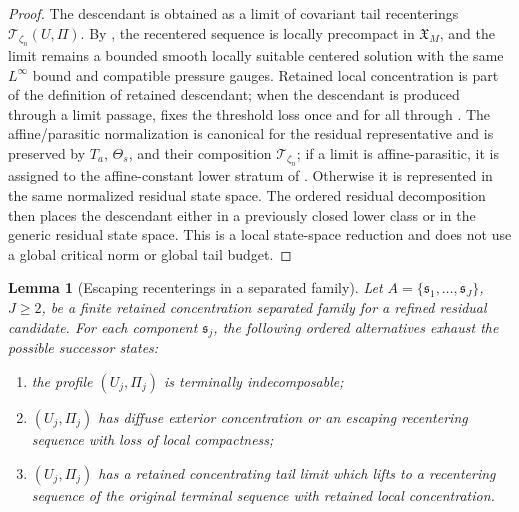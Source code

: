 \documentclass[11pt]{amsart}
\numberwithin{equation}{section}
\theoremstyle{plain}
\newtheorem{lemma}[theorem]{Lemma}
\theoremstyle{definition}
\theoremstyle{remark}
\begin{document}
\begin{proof}
The descendant is obtained as a limit of covariant tail recenterings
\(\mathscr T_{\zeta_n}(U,\Pi)\).  By
, the recentered sequence is locally
precompact in \(\mathfrak X_M\), and the limit remains a bounded smooth
locally suitable centered solution with the same \(L^\infty\) bound and
compatible pressure gauges.  Retained local concentration is part of the
definition of retained descendant; when the descendant is produced through a
limit passage,  fixes the threshold loss once and
for all through .  The affine/parasitic
normalization is canonical for the residual representative and is preserved by
\(T_a\), \(\Theta_s\), and their composition
\(\mathscr T_{\zeta_n}\); if a limit is affine-parasitic, it is assigned to the
affine-constant lower stratum of
.  Otherwise it is represented in the
same normalized residual state space.  The ordered residual decomposition then
places the descendant either in a previously closed lower class or in the
generic residual state space.  This is a local state-space reduction and does
not use a global critical norm or global tail budget.
\end{proof}

\begin{lemma}[Escaping recenterings in a separated family]
\label{lem:finite-successor-alternatives}
Let \(A=\{\mathfrak s_1,\dots,\mathfrak s_J\}\), \(J\ge2\), be a finite
retained concentration separated family for a refined residual candidate.  For each component
\(\mathfrak s_j\), the following ordered alternatives exhaust the possible
successor states:
\begin{enumerate}[label=(\roman*)]
   \item the profile \((U_j,\Pi_j)\) is terminally indecomposable;
   \item \((U_j,\Pi_j)\) has diffuse exterior concentration or an escaping
   recentering sequence with loss of local compactness;
   \item \((U_j,\Pi_j)\) has a retained concentrating tail limit which lifts to a
   recentering sequence of the original terminal sequence with retained local
   concentration.
\end{enumerate}
\end{lemma}
\end{document}
